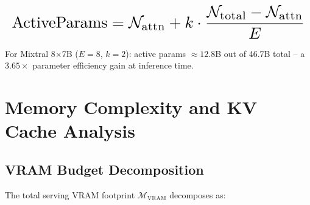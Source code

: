\documentclass[10pt,twocolumn,letterpaper]{article}
\begin{document}
\begin{equation}
\resizebox{\columnwidth}{!}{$\displaystyle
\begin{aligned}
\text{ActiveParams} = \mathcal{N}_{\text{attn}} + k \cdot \frac{\mathcal{N}_{\text{total}} - \mathcal{N}_{\text{attn}}}{E}
\end{aligned}
$}
\end{equation}

























For Mixtral 8$\times$7B ($E = 8$, $k = 2$): active params $\approx 12.8$B out of 46.7B total -- a $3.65\times$ parameter efficiency gain at inference time.




\section{Memory Complexity and KV Cache Analysis}



\subsection{VRAM Budget Decomposition}


The total serving VRAM footprint $\mathcal{M}_{\text{VRAM}}$ decomposes as:
\end{document}
